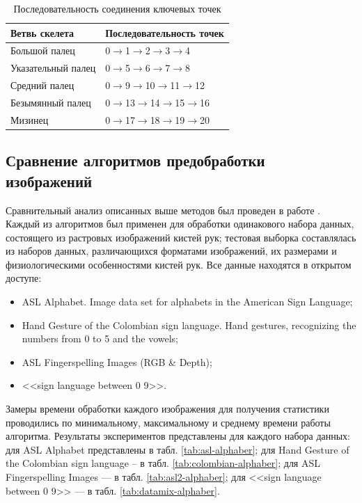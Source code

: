 \begin{table}[h]
	\caption{\label{an:poses-table}Последовательность соединения ключевых точек}
	\begin{center}
		\begin{tabular}{|p{}|p{}|}
			\hline
			Ветвь скелета & Последовательность точек \\
			\hline
			Большой палец & 0$\rightarrow$1$\rightarrow$2$\rightarrow$3$\rightarrow$4 \\	
			\hline
			Указательный палец & 0$\rightarrow$5$\rightarrow$6$\rightarrow$7$\rightarrow$8\\	
			\hline
			Средний палец & 0$\rightarrow$9$\rightarrow$10$\rightarrow$11$\rightarrow$12 \\
			\hline
			Безымянный палец & 0$\rightarrow$13$\rightarrow$14$\rightarrow$15$\rightarrow$16 \\
			\hline
			Мизинец & 0$\rightarrow$17$\rightarrow$18$\rightarrow$19$\rightarrow$20 \\
			\hline
		\end{tabular}
	\end{center}
\end{table}

\subsection{Сравнение алгоритмов предобработки изображений}

Сравнительный анализ описанных выше методов был проведен в работе \cite{Tantsevov}. Каждый из алгоритмов был применен для обработки одинакового набора данных, состоящего из растровых изображений кистей рук; тестовая выборка составлялась из наборов данных, различающихся форматами изображений, их размерами и физиологическими особенностями кистей рук. Все данные находятся в открытом доступе:

\begin{itemize}
	\item ASL Alphabet. Image data set for alphabets in the American Sign Language;
	\item Hand Gesture of the Colombian sign language. Hand gestures, recognizing the numbers from 0 to 5 and the vowels;
	\item ASL Fingerspelling Images (RGB \& Depth);
	\item <<sign language between 0 9>>.
\end{itemize}

Замеры времени обработки каждого изображения для получения статистики проводились по минимальному, максимальному и среднему времени работы алгоритма. Результаты экспериментов представлены для каждого набора данных: для ASL Alphabet представлены в табл. \ref{tab:asl-alphaber}; для Hand Gesture of the Colombian sign language -- в табл. \ref{tab:colombian-alphaber}; для ASL Fingerspelling Images — в табл. \ref{tab:asl2-alphaber}; для <<sign language between 0 9>> — в табл. \ref{tab:datamix-alphaber}.

